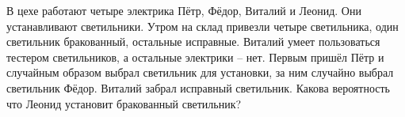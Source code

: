 
В цехе работают четыре электрика Пётр, Фёдор, Виталий и Леонид. Они устанавливают светильники. 
Утром на склад привезли четыре светильника, один светильник бракованный, остальные исправные. 
Виталий умеет пользоваться тестером светильников, а остальные электрики – нет. Первым пришёл 
Пётр и случайным образом выбрал светильник для установки, за ним случайно выбрал светильник Фёдор. 
Виталий забрал исправный светильник.  Какова вероятность что Леонид установит бракованный светильник?
